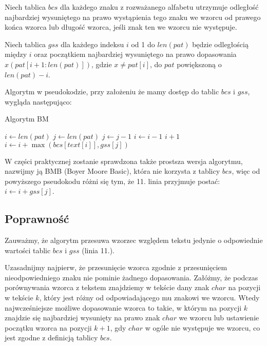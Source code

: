 Niech tablica $bcs$ dla każdego znaku z rozważanego alfabetu utrzymuje odległość najbardziej wysuniętego na prawo wystąpienia tego znaku we wzorcu od prawego końca wzorca lub długość wzorca, jeśli znak ten we wzorcu nie występuje.

Niech tablica $gss$ dla każdego indeksu $i$ od 1 do $len(pat)$ będzie odległością między $i$ oraz początkiem najbardziej wysuniętego na prawo dopasowania $x(pat[i+1:len(pat)])$, gdzie $x \neq pat[i]$, do $pat$ powiększoną o $len(pat) - i$.

\noindent
Algorytm w pseudokodzie, przy założeniu że mamy dostęp do tablic $bcs$ i $gss$, wygląda następująco:
\begin{algorithm}
\caption{Algorytm BM}\label{alg:bm}
\begin{algorithmic}[1]
\State $i \gets len(pat)$
    \State $j \gets len(pat)$
        \State $j \gets j - 1$
        \State $i \gets i - 1$
    \EndWhile
        \State \Return $i + 1$
    \EndIf
    \State $i \gets i + \max(bcs[text[i]], gss[j])$
\EndWhile
\end{algorithmic}
\end{algorithm}

W części praktycznej zostanie sprawdzona także prostsza wersja algorytmu, nazwijmy ją BMB (Boyer Moore Basic), która nie korzysta z tablicy $bcs$, więc od powyższego pseudokodu różni się tym, że 11. linia przyjmuje postać: $i \gets i + gss[j]$.

\subsection{Poprawność}
Zauważmy, że algorytm przesuwa wzorzec względem tekstu jedynie o odpowiednie wartości tablic $bcs$ i $gss$ (linia 11.). 

Uzasadnijmy najpierw, że przesunięcie wzorca zgodnie z przesunięciem nieodpowiedniego znaku nie pominie żadnego dopasowania. Załóżmy, że podczas porównywania wzorca z tekstem znajdziemy w tekście dany znak $char$ na pozycji w tekście $k$, który jest różny od odpowiadającego mu znakowi we wzorcu. Wtedy najwcześniejsze możliwe dopasowanie wzorca to takie, w którym na pozycji $k$ znajdzie się najbardziej wysunięty na prawo znak $char$ we wzorcu lub ustawienie początku wzorca na pozycji $k+1$, gdy $char$ w ogóle nie występuje we wzorcu, co jest zgodne z definicją tablicy $bcs$. 

